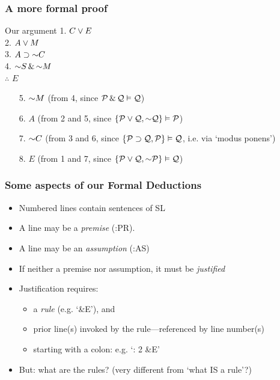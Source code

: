 \begin{frame}
  \frametitle{A more formal proof}

  \begin{block}{Our argument}
    1. \alert<4>{$C \vee E$}\\
    2. \alert<2>{$A \vee M$}\\
    3. \alert<3>{$A \eif \enot C$}\\
    4. \alert<1>{$\enot S \eand \enot M$} \\
  $\therefore$ $E$
  \end{block}

  \begin{enumerate}[<+->]
    \item[5.] \alert<1,2>{$\enot M$} (from 4, since $\mathcal{P} \,\&\, \mathcal{Q}
    \vDash \mathcal{Q}$)
    \item[6.] \alert<2,3>{$A$} (from 2 and 5, since $\{ \metav{P} \eor \metav{Q}, \enot \metav{Q} \} \entails \metav{P}$)
    \item[7.] \alert<3,4>{$\enot C$} (from 3 and 6, since $\{ \mathcal{P} \supset \mathcal{Q}, \mathcal{P} \} \vDash \mathcal{Q}$, i.e. via `modus ponens')
    \item[8.] \alert<4>{$E$} (from 1 and 7, since $\{ \metav{P} \eor \metav{Q}, \enot \metav{P} \}    \entails \metav{Q}$)
  \end{enumerate}

\end{frame}

\begin{frame}
  \frametitle{Some aspects of our Formal Deductions}

  \begin{itemize}[<+->]
    \item Numbered lines contain sentences of SL
    \item A line may be a \emph{premise} (:PR).
\item A line may be an \emph{assumption} (:AS)
    \item If neither a premise nor assumption, it must be \emph{justified} %
    \item Justification requires:
\medskip
      \begin{itemize}
        \item a \emph{rule} (e.g. `\&E'), and
        \item prior line(s) invoked by the rule---referenced by line number(s)
       \item starting with a colon: e.g. `: 2 \&E'
      \end{itemize}
\medskip
    \item But: what are the rules? (very different from `what IS a rule'?)
  \end{itemize}
\end{frame}


